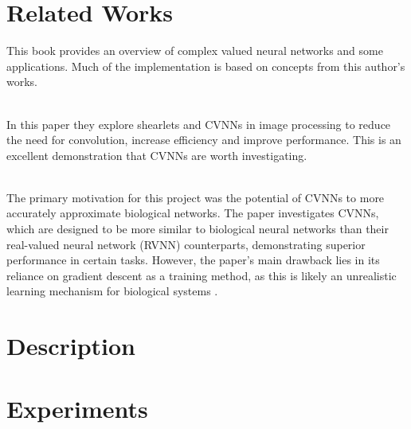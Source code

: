 \documentclass{article}
\let\citep\parencite   %
\begin{document}
\section{Related Works}
\begin{center}\textbf{}\end{center}
This book provides an overview of complex valued neural networks and some applications. Much of the implementation is based on concepts from this author's works.\\ \\
\begin{center}\textbf{}\end{center}
In this paper they explore shearlets and CVNNs in image processing to reduce the need for convolution, increase efficiency and improve performance. This is an excellent demonstration that CVNNs are worth investigating. \\ \\
\begin{center}\textbf{}\end{center}
The primary motivation for this project was the potential of CVNNs to more accurately approximate biological networks. The paper investigates CVNNs, which are designed to be more similar to biological neural networks than their real-valued neural network (RVNN) counterparts, demonstrating superior performance in certain tasks. However, the paper's main drawback lies in its reliance on gradient descent as a training method, as this is likely an unrealistic learning mechanism for biological systems \citep{hintonforwardforward}.

\section{Description}

\section{Experiments}
\end{document}
